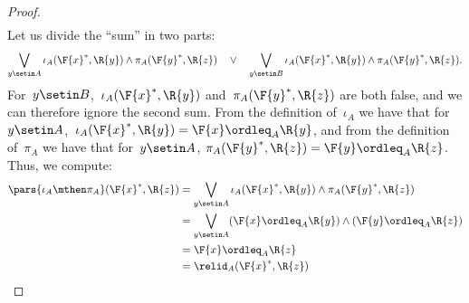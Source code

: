 \begin{proof}
\begin{equation}
\begin{aligned}
        \end{aligned}
    \end{equation}
    Let us divide the ``sum'' in two parts:
    \begin{equation}
        \bigvee_{y \setin A} \iota_A(\F{x}^*,\R{y}) \wedge \pi_A(\F{y}^*,\R{z}) \quad\vee\quad
        \bigvee_{y \setin B} \iota_A(\F{x}^*,\R{y}) \wedge \pi_A(\F{y}^*,\R{z}).
    \end{equation}
    For~$y \setin B$,~$\iota_A(\F{x}^*,\R{y})$ and~$\pi_A(\F{y}^*,\R{z})$ are both false, and we can therefore ignore the second sum.
    From the definition of~$\iota_A$ we have that for~$y\setin A$,~$ \iota_A(\F{x}^*,\R{y})=\F{x} \ordleq_A \R{y}$, and from the definition of~$\pi_A$ we have that for~$y\setin A$, $\pi_A(\F{y}^*,\R{z})=\F{y} \ordleq_A \R{z}$.
    Thus, we compute:
    \begin{equation}
        \begin{aligned}
            \pars{\iota_A\mthen \pi_A}(\F{x}^*, \R{z}) & = \bigvee_{y \setin A} \iota_A(\F{x}^*,\R{y}) \wedge \pi_A(\F{y}^*,\R{z}) \\
                                                       & = \bigvee_{y \setin A} (\F{x} \ordleq_A \R{y}) \wedge (\F{y} \ordleq_A \R{z}) \\
                                                       & = \F{x} \ordleq_A \R{z} \\
                                                       & = \relid_A(\F{x}^*, \R{z})
        \end{aligned}
    \end{equation}
\end{proof}

